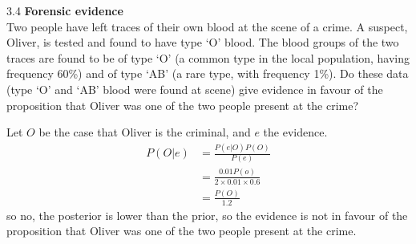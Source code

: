 \documentclass[12pt, a4paper]{article}
\begin{document}
\begin{prob}{3.4}
    \textbf{Forensic evidence} \\
Two people have left traces of their own blood at the scene of a crime. A suspect, Oliver, is tested and found to have type `O' blood. The blood groups of the two traces are found to be of type `O' (a common type in the local population, having frequency 60\%) and of type `AB' (a rare type, with frequency 1\%). Do these data (type `O' and `AB' blood were found at scene) give evidence in favour of the proposition that Oliver was one of the two people present at the crime?
\end{prob}
\begin{sol}
    Let $O$ be the case that Oliver is the criminal, and $e$ the evidence.
    \begin{align*}
        P(O|e) &= \frac{P(e|O)P(O)}{P(e)} \\
        &= \frac{0.01P(o)}{2 \times 0.01 \times 0.6} \\
        &= \frac{P(O)}{1.2}
    \end{align*}
    so no, the posterior is lower than the prior, so the evidence is not in favour of the proposition that Oliver was one of the two people present at the crime.
\end{sol}
\bigskip
\end{document}
